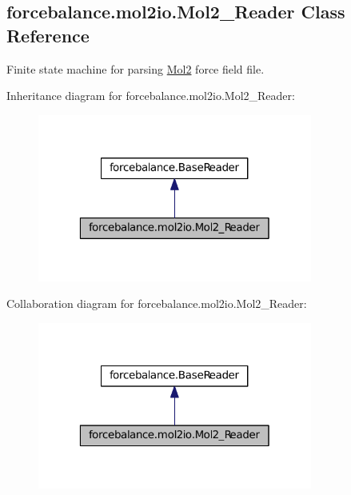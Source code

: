 \hypertarget{classforcebalance_1_1mol2io_1_1Mol2__Reader}{\subsection{forcebalance.\-mol2io.\-Mol2\-\_\-\-Reader \-Class \-Reference}
\label{classforcebalance_1_1mol2io_1_1Mol2__Reader}
}


\-Finite state machine for parsing \hyperlink{namespaceforcebalance_1_1Mol2}{\-Mol2} force field file.  




\-Inheritance diagram for forcebalance.\-mol2io.\-Mol2\-\_\-\-Reader\-:
\nopagebreak
\begin{figure}[H]
\begin{center}
\leavevmode
\includegraphics[width=256pt]{classforcebalance_1_1mol2io_1_1Mol2__Reader__inherit__graph}
\end{center}
\end{figure}


\-Collaboration diagram for forcebalance.\-mol2io.\-Mol2\-\_\-\-Reader\-:
\nopagebreak
\begin{figure}[H]
\begin{center}
\leavevmode
\includegraphics[width=256pt]{classforcebalance_1_1mol2io_1_1Mol2__Reader__coll__graph}
\end{center}
\end{figure}
